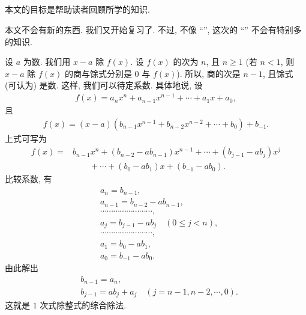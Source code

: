 \subsection*{}

本文的目标是帮助读者回顾所学的知识.

本文不会有新的东西. 我们又开始复习了. 不过, 不像 ``'', 这次的 ``'' 不会有特别多的知识.

\begin{proposition}
    设 $a$ 为数. 我们用 $x-a$ 除 $f(x)$. 设 $f(x)$ 的次为 $n$, 且 $n \geq 1$ (若 $n < 1$, 则 $x-a$ 除 $f(x)$ 的商与馀式分别是 $0$ 与 $f(x)$). 所以, 商的次是 $n-1$, 且馀式 (可认为) 是数. 这样, 我们可以待定系数. 具体地说, 设
    \begin{align*}
        f(x) = a_n x^n + a_{n-1} x^{n-1} + \cdots + a_1 x + a_0,
    \end{align*}
    且
    \begin{align*}
        f(x) = (x - a) (b_{n-1} x^{n-1} + b_{n-2} x^{n-2} + \cdots + b_0) + b_{-1}.
    \end{align*}
    上式可写为
    \begin{align*}
        f(x)
        = {} & b_{n-1} x^n + (b_{n-2} - ab_{n-1}) x^{n-1} + \cdots + (b_{j-1} - ab_j) x^j \\
             & \qquad + \cdots + (b_0 - ab_1) x + (b_{-1} - ab_0).
    \end{align*}
    比较系数, 有
    \begin{align*}
         & a_n = b_{n-1},                                           \\
         & a_{n-1} = b_{n-2} - ab_{n-1},                            \\
         & \cdots \cdots \cdots \cdots \cdots \cdots \cdots \cdots, \\
         & a_j = b_{j-1} - ab_j \quad (0 \leq j < n),               \\
         & \cdots \cdots \cdots \cdots \cdots \cdots \cdots \cdots, \\
         & a_1 = b_0 - ab_1,                                        \\
         & a_0 = b_{-1} - ab_0.
    \end{align*}
    由此解出
    \begin{align*}
         & b_{n-1} = a_n,                                     \\
         & b_{j-1} = ab_j + a_j \quad (j = n-1,n-2,\cdots,0).
    \end{align*}
    这就是 $1$ 次式除整式的综合除法.
\end{proposition}


